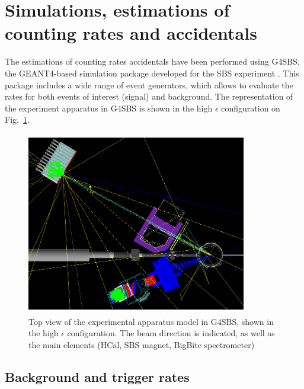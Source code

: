 
\section{Simulations, estimations of counting rates and accidentals}
\label{sec:simu}

The estimations of counting rates accidentals have been performed using G4SBS, the GEANT4-based simulation package developed for the SBS experiment \cite{g4sbs}.
This package includes a wide range of event generators, which allows to evaluate the rates for both events of interest (signal) and background.
The representation of the experiment apparatus in G4SBS is shown in the high $\epsilon$ configuration on Fig.~\ref{fig:g4sbssetup}. 
%
\begin{figure}[!h]
  \begin{center}
    \includegraphics[width=9.6cm,height=8cm]{Plots/SetupHiEPoint.png}
    \caption{Top view of the experimental apparatus model in G4SBS, shown in the high $\epsilon$ configuration. The beam direction is indicated, as well as the main elements (HCal, SBS magnet, BigBite spectrometer)}
    \label{fig:g4sbssetup}
  \end{center}
\end{figure}
%

\subsection{Background and trigger rates}


